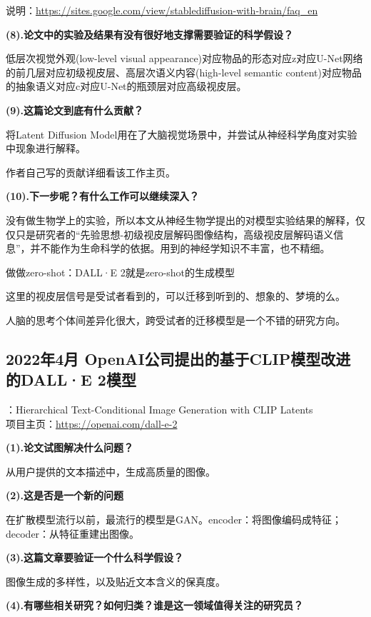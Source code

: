 \documentclass[12pt, a4paper, oneside]{ctexart}
\begin{document}
    说明：\url{https://sites.google.com/view/stablediffusion-with-brain/faq_en}

    \noindent\textbf{(8).论文中的实验及结果有没有很好地支撑需要验证的科学假设？}

    低层次视觉外观(low-level visual appearance)对应物品的形态对应z对应U-Net网络的前几层对应初级视皮层、高层次语义内容(high-level semantic content)对应物品的抽象语义对应c对应U-Net的瓶颈层对应高级视皮层。

    \noindent\textbf{(9).这篇论文到底有什么贡献？}

    将Latent Diffusion Model用在了大脑视觉场景中，并尝试从神经科学角度对实验中现象进行解释。

    作者自己写的贡献详细看该工作主页。

    \noindent\textbf{(10).下一步呢？有什么工作可以继续深入？}

    没有做生物学上的实验，所以本文从神经生物学提出的对模型实验结果的解释，仅仅只是研究者的“先验思想-初级视皮层解码图像结构，高级视皮层解码语义信息”，并不能作为生命科学的依据。用到的神经学知识不丰富，也不精细。

    做做zero-shot：DALL·E 2\cite{ramesh2022hierarchical}就是zero-shot的生成模型

    这里的视皮层信号是受试者看到的，可以迁移到听到的、想象的、梦境的么。

    人脑的思考个体间差异化很大，跨受试者的迁移模型是一个不错的研究方向。

    \subsection{2022年4月 OpenAI公司提出的基于CLIP模型改进的DALL·E 2模型\cite{ramesh2022hierarchical}}
    ：Hierarchical Text-Conditional Image Generation with CLIP Latents\\
    项目主页：\url{https://openai.com/dall-e-2}

    \noindent\textbf{(1).论文试图解决什么问题？}

    从用户提供的文本描述中，生成高质量的图像。

    \noindent\textbf{(2).这是否是一个新的问题}

    在扩散模型流行以前，最流行的模型是GAN。encoder：将图像编码成特征；decoder：从特征重建出图像。

    \noindent\textbf{(3).这篇文章要验证一个什么科学假设？}

    图像生成的多样性，以及贴近文本含义的保真度。

    \noindent\textbf{(4).有哪些相关研究？如何归类？谁是这一领域值得关注的研究员？}
\end{document}

